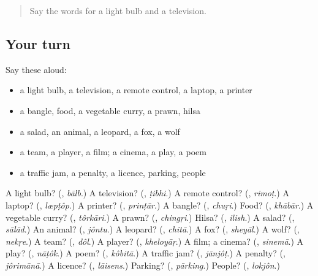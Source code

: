 \label{lesson:BN-R226-second-pass-words-from-chapters-222-226}



\begin{quote}
Say the words for a light bulb and a television.
\end{quote}

\subsection*{Your turn}
Say these aloud:

\begin{itemize}
\raggedright
  \item a light bulb, a television, a remote control, a laptop, a printer
  \item a bangle, food, a vegetable curry, a prawn, hilsa
  \item a salad, an animal, a leopard, a fox, a wolf
  \item a team, a player, a film; a cinema, a play, a poem
  \item a traffic jam, a penalty, a licence, parking, people
\end{itemize}

\begin{tcolorbox}[breakable,colback=teal!4,colframe=teal!35!black,title={Before you move on}]
A light bulb? (\textbf{}, \emph{bālb}.) A television? (\textbf{}, \emph{ṭibhi}.) A remote control? (\textbf{}, \emph{rimoṭ}.) A laptop? (\textbf{}, \emph{læpṭôp}.) A printer? (\textbf{}, \emph{prinṭār}.) A bangle? (\textbf{}, \emph{chuṛi}.) Food? (\textbf{}, \emph{khābār}.) A vegetable curry? (\textbf{}, \emph{tôrkāri}.) A prawn? (\textbf{}, \emph{chingṛi}.) Hilsa? (\textbf{}, \emph{ilish}.) A salad? (\textbf{}, \emph{sālād}.) An animal? (\textbf{}, \emph{jôntu}.) A leopard? (\textbf{}, \emph{chitā}.) A fox? (\textbf{}, \emph{sheyāl}.) A wolf? (\textbf{}, \emph{nekṛe}.) A team? (\textbf{}, \emph{dôl}.) A player? (\textbf{}, \emph{kheloyāṛ}.) A film; a cinema? (\textbf{}, \emph{sinemā}.) A play? (\textbf{}, \emph{nāṭôk}.) A poem? (\textbf{}, \emph{kôbitā}.) A traffic jam? (\textbf{}, \emph{jānjôṭ}.) A penalty? (\textbf{}, \emph{jôrimānā}.) A licence? (\textbf{}, \emph{lāisens}.) Parking? (\textbf{}, \emph{pārking}.) People? (\textbf{}, \emph{lokjôn}.)
\end{tcolorbox}
